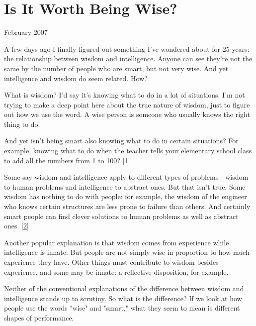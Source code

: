 \chapter{Is It Worth Being Wise?}


            
              
                

February 2007

A few days ago I finally figured out
                  something I've wondered about for 25 years: the relationship
                  between wisdom and intelligence. Anyone can see they're not
                  the same by the number of people who are smart, but not very
                  wise. And yet intelligence and wisdom do seem related. How?

What
                  is wisdom? I'd say it's knowing what to do in a lot of
                  situations. I'm not trying to make a deep point here about the
                  true nature of wisdom, just to figure out how we use the word.
                  A wise person is someone who usually knows the right thing to
                  do.

And yet isn't being smart also knowing what to
                  do in certain situations? For example, knowing what to do when
                  the teacher tells your elementary school class to add all the
                  numbers from 1 to 100?
                  [\href{\#f1n}{1}]

Some say wisdom and intelligence apply to
                  different types of problems---wisdom to human problems and
                  intelligence to abstract ones. But that isn't true. Some
                  wisdom has nothing to do with people: for example, the wisdom
                  of the engineer who knows certain structures are less prone to
                  failure than others. And certainly smart people can find
                  clever solutions to human problems as well as abstract ones.
                  [\href{\#f2n}{2}]

Another popular explanation is that wisdom comes
                  from experience while intelligence is innate. But people are
                  not simply wise in proportion to how much experience they
                  have. Other things must contribute to wisdom besides
                  experience, and some may be innate: a reflective disposition,
                  for example.

Neither of the conventional
                  explanations of the difference between wisdom and intelligence
                  stands up to scrutiny. So what is the difference? If we look
                  at how people use the words "wise" and "smart," what they seem
                  to mean is different shapes of performance.

